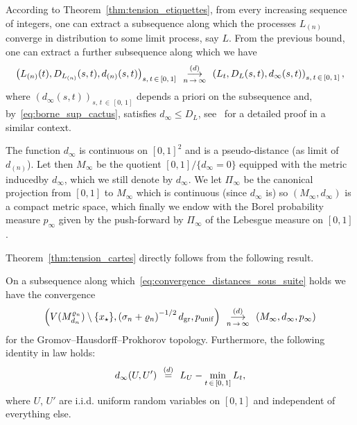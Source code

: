 \documentclass[10pt]{amsart}
\theoremstyle{definition}\newtheorem{defi}[theo]{Definition}\newtheorem{rema}[theo]{Remark}\newtheorem{exam}[theo]{Example}\newtheorem{exem}[theo]{Example}\newtheorem{nota}[theo]{Notation}
\newcommand{\1}{\ensembles{1}}
\renewcommand{\le}{\leqslant}
\newcommand{\dgr}{d_{\mathrm{gr}}}
\newcommand{\pgr}{p_{\mathrm{unif}}}
\newcommand{\Vmn}{V(M_{d_n}^{\varrho_n})}
\newcommand{\cvloi}[1][n]{\enskip\mathop{\longrightarrow}^{(d)}_{#1\,\to\, \infty}\enskip}
\newcommand{\eqloi}{\enskip\mathop{=}^{(d)}\enskip}
\providecommand{\?}{}
\begin{document}
According to Theorem~\ref{thm:tension_etiquettes}, from every increasing sequence of integers, one can extract a subsequence along which the processes $L_{(n)}$ converge in distribution to some limit process, say $L$. From the previous bound, one can extract a further subsequence along which we have
\begin{equation}\label{eq:convergence_distances_sous_suite}
\left(L_{(n)}(t), D_{L_{(n)}}(s, t), d_{(n)}(s, t)\right)_{s,\,t\,\in\,[0,\,1]}
\cvloi \left(L_t, D_L(s,t), d_\infty(s,t)\right)_{s,\,t\,\in\,[0,\,1]},
\end{equation}
where $(d_\infty(s,t))_{s,\,t\,\in\,[0,\,1]}$ depends a priori on the subsequence and, by~\eqref{eq:borne_sup_cactus}, satisfies $d_\infty \le D_L$, see~\cite[Proposition~3.2]{LG07} for a detailed proof in a similar context.

The function $d_\infty$ is continuous on $[0,1]^2$ and is a pseudo-distance (as limit of $d_{(n)}$). Let then $M_\infty$ be the quotient $[0,1] / \{d_\infty=0\}$ equipped with the metric induced\linebreak by $d_\infty$, which we still denote by $d_\infty$. We let $\Pi_\infty$ be the canonical projection from $[0,1]$ to $M_\infty$ which is continuous (since $d_\infty$ is) so $(M_\infty, d_\infty)$ is a compact metric space, which finally we endow with the Borel probability measure $p_\infty$ given by the push-forward by $\Pi_\infty$ of the Lebesgue measure on $[0,1]$.

Theorem~\ref{thm:tension_cartes} directly follows from the following result.


\begin{prop}\label{prop:limite_sous_suite_carte}
On a subsequence along which~\eqref{eq:convergence_distances_sous_suite} holds we have the convergence
\[
\left(\Vmn\setminus\{x_\star\}, \left(\sigma_n + \varrho_n\right)^{-1/2} \dgr, \pgr\right) \cvloi \left(M_\infty, d_\infty, p_\infty\right)
\]
for the Gromov--Hausdorff--Prokhorov topology. Furthermore, the following identity in law holds:
\begin{equation}\label{eq:distance_points_unif_carte_sous_suite}
d_\infty(U,U') \eqloi L_U - \min_{t\,\in\,[0,\,1]} L_t,
\end{equation}
where $U$, $U'$ are i.i.d. uniform random variables on $[0,1]$ and independent of everything else.
\end{prop}
\end{document}
